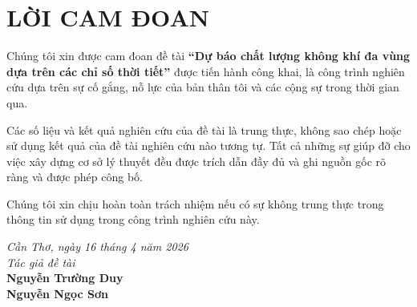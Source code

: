 \chapter*{LỜI CAM ĐOAN}

Chúng tôi xin được cam đoan đề tài \textbf{“Dự báo chất lượng không khí đa vùng dựa trên các chỉ số thời tiết”} được tiến hành công khai, là công trình nghiên cứu dựa trên sự cố gắng, nỗ lực của bản thân tôi và các cộng sự trong thời gian qua.

Các số liệu và kết quả nghiên cứu của đề tài là trung thực, không sao chép hoặc sử dụng kết quả của đề tài nghiên cứu nào tương tự. Tất cả những sự giúp đỡ cho việc xây dựng cơ sở lý thuyết đều được trích dẫn đầy đủ và ghi nguồn gốc rõ ràng và được phép công bố.

Chúng tôi xin chịu hoàn toàn trách nhiệm nếu có sự không trung thực trong thông tin sử dụng trong công trình nghiên cứu này.
\vspace{0.5cm}
\begin{flushright}
    \begin{minipage}{0.5\textwidth}
        \centering
        \textit{Cần Thơ, ngày 16 tháng 4 năm 2026} \\[10pt]
        \textit{Tác giả đề tài} \\[0.5cm]
        \textbf{Nguyễn Trường Duy} \\[10pt]
        \textbf{Nguyễn Ngọc Sơn}
    \end{minipage}
\end{flushright}

